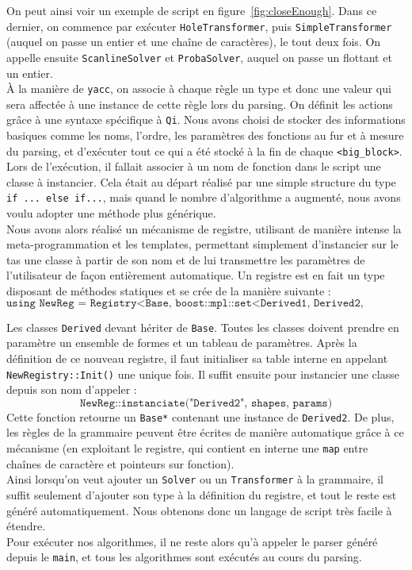 On peut ainsi voir un exemple de script en figure~\ref{fig:closeEnough}. Dans ce dernier, on commence par exécuter \texttt{HoleTransformer}, puis \texttt{SimpleTransformer} (auquel on passe un entier et une chaîne de caractères), le tout deux fois. On appelle ensuite \texttt{ScanlineSolver} et \texttt{ProbaSolver}, auquel on passe un flottant et un entier.\\

À la manière de \texttt{yacc}, on associe à chaque règle un type et donc une valeur qui sera affectée à une instance de cette règle lors du parsing. On définit les actions grâce à une syntaxe spécifique à \texttt{Qi}. Nous avons choisi de stocker des informations basiques comme les noms, l'ordre, les paramètres des fonctions au fur et à mesure du parsing, et d'exécuter tout ce qui a été stocké à la fin de chaque \texttt{<big\_block>}.\\

Lors de l'exécution, il fallait associer à un nom de fonction dans le script une classe à instancier. Cela était au départ réalisé par une simple structure du type \texttt{if ... else if...}, mais quand le nombre d'algorithme a augmenté, nous avons voulu adopter une méthode plus générique.\\

Nous avons alors réalisé un mécanisme de registre, utilisant de manière intense la meta-programmation et les templates, permettant simplement d'instancier sur le tas une classe à partir de son nom et de lui transmettre les paramètres de l'utilisateur de façon entièrement automatique. Un registre est en fait un type disposant de méthodes statiques et se crée de la manière suivante :
$$\texttt{using NewReg = Registry<Base, boost::mpl::set<Derived1, Derived2, ...>::type>}$$

Les classes \texttt{Derived} devant hériter de \texttt{Base}. Toutes les classes doivent prendre en paramètre un ensemble de formes et un tableau de paramètres. Après la définition de ce nouveau registre, il faut initialiser sa table interne en appelant \texttt{NewRegistry::Init()} une unique fois. Il suffit ensuite pour instancier une classe depuis son nom d'appeler :
$$\texttt{NewReg::instanciate("Derived2", shapes, params)}$$
Cette fonction retourne un \texttt{Base*} contenant une instance de \texttt{Derived2}. De plus, les règles de la grammaire peuvent être écrites de manière automatique grâce à ce mécanisme (en exploitant le registre, qui contient en interne une \texttt{map} entre chaînes de caractère et pointeurs sur fonction).\\

Ainsi lorsqu'on veut ajouter un \texttt{Solver} ou un \texttt{Transformer} à la grammaire, il suffit seulement d'ajouter son type à la définition du registre, et tout le reste est généré automatiquement. Nous obtenons donc un langage de script très facile à étendre.\\

Pour exécuter nos algorithmes, il ne reste alors qu'à appeler le parser généré depuis le \texttt{main}, et tous les algorithmes sont exécutés au cours du parsing.
    
